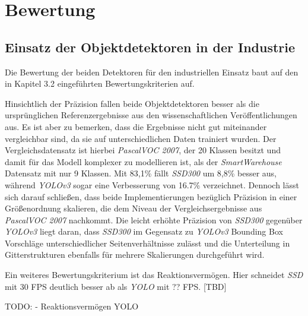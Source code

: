 \chapter{Bewertung}

\section{Einsatz der Objektdetektoren in der Industrie}

Die Bewertung der beiden Detektoren für den industriellen Einsatz baut auf den in Kapitel 3.2 eingeführten Bewertungskriterien auf. 

Hinsichtlich der Präzision fallen beide Objektdetektoren besser als die ursprünglichen Referenzergebnisse aus den wissenschaftlichen Veröffentlichungen aus. Es ist aber zu bemerken, dass die Ergebnisse nicht gut miteinander vergleichbar sind, da sie auf unterschiedlichen Daten trainiert wurden. Der Vergleichsdatensatz ist hierbei \textit{PascalVOC 2007}, der 20 Klassen besitzt und damit für das Modell komplexer zu modellieren ist, als der \textit{SmartWarehouse} Datensatz mit nur 9 Klassen. Mit 83,1\% fällt \textit{SSD300} um 8,8\% besser aus, während \textit{YOLOv3} sogar eine Verbesserung von 16.7\% verzeichnet. Dennoch lässt sich darauf schließen, dass beide Implementierungen bezüglich Präzision in einer Größenordnung skalieren, die dem Niveau der Vergleichsergebnisse aus \textit{PascalVOC 2007} nachkommt. Die leicht erhöhte Präzision von \textit{SSD300} gegenüber \textit{YOLOv3} liegt daran, dass \textit{SSD300} im Gegensatz zu \textit{YOLOv3} Bounding Box Vorschläge unterschiedlicher Seitenverhältnisse zulässt und die Unterteilung in Gitterstrukturen ebenfalls für mehrere Skalierungen durchgeführt wird.

Ein weiteres Bewertungskriterium ist das Reaktionsvermögen. Hier schneidet \textit{SSD} mit 30 FPS deutlich besser ab als \textit{YOLO} mit ?? FPS. [TBD]

TODO:
- Reaktionsvermögen YOLO


